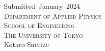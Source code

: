 \begin{titlepage}
{\Large Submitted\,\,\,January\,\,\,2024}\\[3cm]
\textsc{\LARGE Department of Applied Physics }\\[0.5cm]
\textsc{\LARGE School of Engineering         }\\[0.5cm]
\textsc{\LARGE The University of Tokyo       }\\[1.5cm]
{\Large Kotaro \textsc{Shimizu}}\\[0.5cm]
\vfill
\afterpage{\blankpage}
\end{titlepage}
